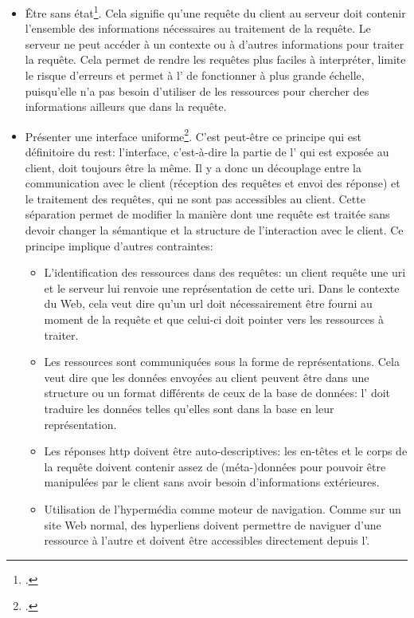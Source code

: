\begin{itemize}
	\item Être sans état\footcite[p. 78-79]{fielding_architectural_2000}. Cela signifie qu'une requête du client au serveur doit contenir l'ensemble des informations nécessaires au traitement de la requête. Le serveur ne peut accéder à un contexte ou à d'autres informations pour traiter la requête. Cela permet de rendre les requêtes plus faciles à interpréter, limite le risque d'erreurs et permet à l'\api{} de fonctionner à plus grande échelle, puisqu'elle n'a pas besoin d'utiliser de les ressources pour chercher des informations ailleurs que dans la requête.
	\item Présenter une interface uniforme\footcite[p. 81-82, 86-97]{fielding_architectural_2000}. C'est peut-être ce principe qui est définitoire du \gls{rest}: l'interface, c'est-à-dire la partie de l'\api{} qui est exposée au client, doit toujours être la même. Il y a donc un découplage entre la communication avec le client (réception des requêtes et envoi des réponse) et le traitement des requêtes, qui ne sont pas accessibles au client. Cette séparation permet de modifier la manière dont une requête est traitée sans devoir changer la sémantique et la structure de l'interaction avec le client. Ce principe implique d'autres contraintes:
	\begin{itemize}
		\item L'identification des ressources dans des requêtes: un client requête une \gls{uri} et le serveur lui renvoie une représentation de cette \gls{uri}. Dans le contexte du Web, cela veut dire qu'un \gls{url} doit nécessairement être fourni au moment de la requête et que celui-ci doit pointer vers les ressources à traiter.
		\item Les ressources sont communiquées sous la forme de représentations. Cela veut dire que les données envoyées au client peuvent être dans une structure ou un format différents de ceux de la base de données: l'\api{} doit traduire les données telles qu'elles sont dans la base en leur représentation.
		\item Les réponses \gls{http} doivent être auto-descriptives: les en-têtes et le corps de la requête doivent contenir assez de (méta-)données pour pouvoir être manipulées par le client sans avoir besoin d'informations extérieures.
		\item Utilisation de l'hypermédia comme moteur de navigation. Comme sur un site Web normal, des hyperliens doivent permettre de naviguer d'une ressource à l'autre et doivent être accessibles directement depuis l'\api{}.

\end{itemize}
\end{itemize}
